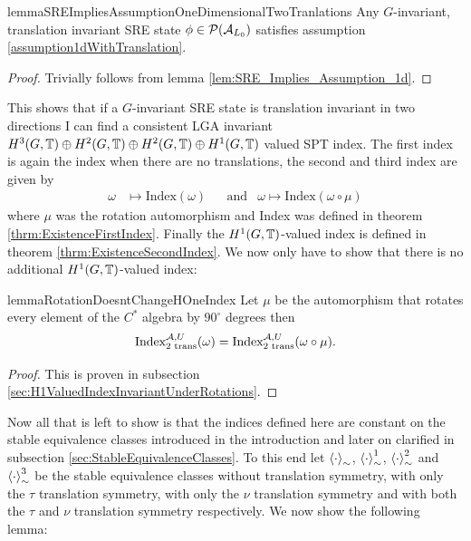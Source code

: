 \documentclass[12pt,a4paper,twoside]{article}
\numberwithin{equation}{section}
\begin{document}
\begin{restatable}{lemma}{SREImpliesAssumptionOneDimensionalTwoTranlations}\label{lem:SRE_Implies_Assumption_1dTwoTranslations}
	Any $G$-invariant, translation invariant SRE state $\phi\in\PP(\AA_{L_0})$ satisfies assumption \ref{assumption1dWithTranslation}.
\end{restatable}
\begin{proof}
	Trivially follows from lemma \ref{lem:SRE_Implies_Assumption_1d}.
\end{proof}
This shows that if a $G$-invariant SRE state is translation invariant in two directions I can find a consistent LGA invariant $H^3(G,\TT)\oplus H^2(G,\TT)\oplus H^2(G,\TT)\oplus H^1(G,\TT)$ valued SPT index. The first index is again the index when there are no translations, the second and third index are given by
\begin{align}
	\omega&\mapsto \textrm{Index}(\omega)&&\text{and}&\omega\mapsto \textrm{Index}(\omega\circ\mu)
\end{align}
where $\mu$ was the rotation automorphism and Index was defined in theorem \ref{thrm:ExistenceFirstIndex}. Finally the $H^1(G,\TT)$-valued index is defined in theorem \ref{thrm:ExistenceSecondIndex}. We now only have to show that there is no additional $H^1(G,\TT)$-valued index:
\begin{restatable}{lemma}{RotationDoesntChangeHOneIndex}\label{lem:RotationDoesn'tChangeH1Index}
	Let $\mu$ be the automorphism that rotates every element of the $C^*$ algebra by $90^\circ$ degrees then
	\begin{equation}
		\textrm{Index}_{\text{2 trans}}^{\AA,U}(\omega)=\textrm{Index}_{\text{2 trans}}^{\AA,U}(\omega\circ\mu).
	\end{equation}
\end{restatable}
\begin{proof}
	This is proven in subsection \ref{sec:H1ValuedIndexInvariantUnderRotations}.
\end{proof}
Now all that is left to show is that the indices defined here are constant on the stable equivalence classes introduced in the introduction and later on clarified in subsection \ref{sec:StableEquivalenceClasses}. To this end let $\expval{\cdot}_\sim$, $\expval{\cdot}_\sim^1$, $\expval{\cdot}_\sim^2$ and $\expval{\cdot}_\sim^3$ be the stable equivalence classes without translation symmetry, with only the $\tau$ translation symmetry, with only the $\nu$ translation symmetry and with both the $\tau$ and $\nu$ translation symmetry respectively. We now show the following lemma:
\end{document}
